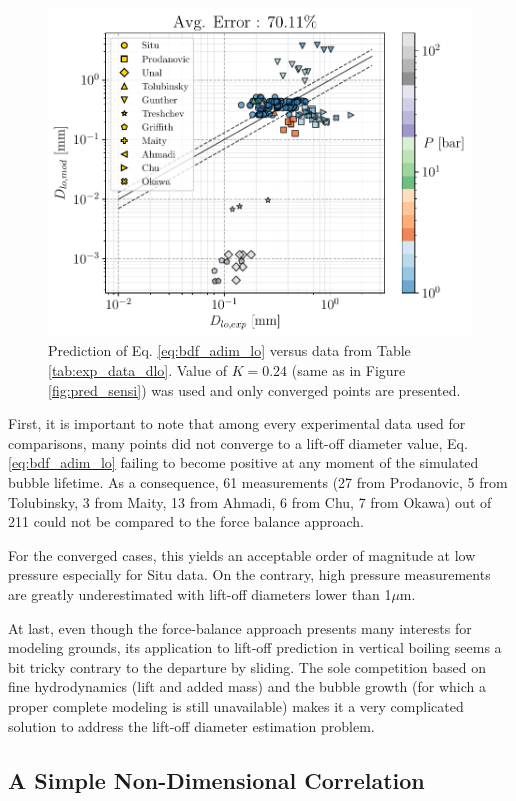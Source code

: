 \begin{figure}[!h]
\centering
\includegraphics[width=0.75\linewidth]{img/bub_dyn/lift-off/pred_bdf.pdf}
\caption{Prediction of Eq. \ref{eq:bdf_adim_lo} versus data from Table \ref{tab:exp_data_dlo}. Value of $K=0.24$ (same as in Figure \ref{fig:pred_sensi}) was used and only converged points are presented.}
\label{fig:pred_bdf_dlo}
\end{figure}
\npar

First, it is important to note that among every experimental data used for comparisons, many points did not converge to a lift-off diameter value, Eq. \ref{eq:bdf_adim_lo} failing to become positive at any moment of the simulated bubble lifetime. As a consequence, 61 measurements (27 from Prodanovic, 5 from Tolubinsky, 3 from Maity, 13 from Ahmadi, 6 from Chu, 7 from Okawa) out of 211 could not be compared to the force balance approach.

For the converged cases, this yields an acceptable order of magnitude at low pressure especially for Situ data. On the contrary, high pressure measurements are greatly underestimated with lift-off diameters lower than 1$\mu$m.

\npar

At last, even though the force-balance approach presents many interests for modeling grounds, its application to lift-off prediction in vertical boiling seems a bit tricky contrary to the departure by sliding. The sole competition based on fine hydrodynamics (lift and added mass) and the bubble growth (for which a proper complete modeling is still unavailable) makes it a very complicated solution to address the lift-off diameter estimation problem. 


\subsection{A Simple Non-Dimensional Correlation}


